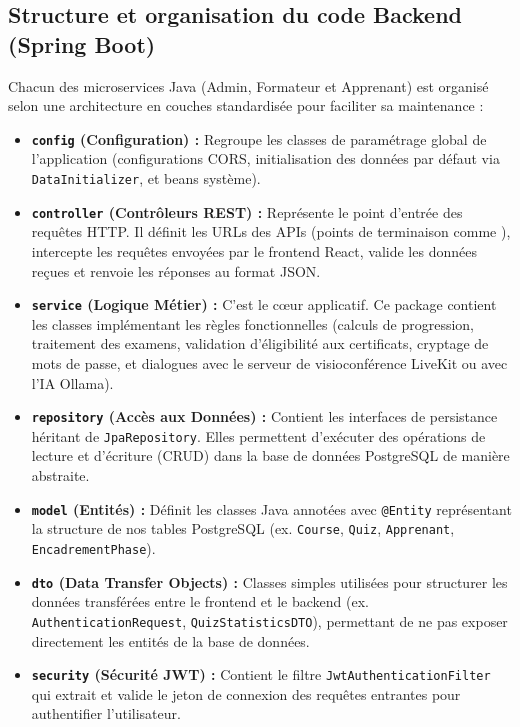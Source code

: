 \subsection{Structure et organisation du code Backend (Spring Boot)}
Chacun des microservices Java (Admin, Formateur et Apprenant) est organisé selon une architecture en couches standardisée pour faciliter sa maintenance :
\begin{itemize}
    \item \textbf{\texttt{config} (Configuration) :} Regroupe les classes de paramétrage global de l'application (configurations CORS, initialisation des données par défaut via \texttt{DataInitializer}, et beans système).
    \item \textbf{\texttt{controller} (Contrôleurs REST) :} Représente le point d'entrée des requêtes HTTP. Il définit les URLs des APIs (points de terminaison comme ), intercepte les requêtes envoyées par le frontend React, valide les données reçues et renvoie les réponses au format JSON.
    \item \textbf{\texttt{service} (Logique Métier) :} C'est le cœur applicatif. Ce package contient les classes implémentant les règles fonctionnelles (calculs de progression, traitement des examens, validation d'éligibilité aux certificats, cryptage de mots de passe, et dialogues avec le serveur de visioconférence LiveKit ou avec l'IA Ollama).
    \item \textbf{\texttt{repository} (Accès aux Données) :} Contient les interfaces de persistance héritant de \texttt{JpaRepository}. Elles permettent d'exécuter des opérations de lecture et d'écriture (CRUD) dans la base de données PostgreSQL de manière abstraite.
    \item \textbf{\texttt{model} (Entités) :} Définit les classes Java annotées avec \texttt{@Entity} représentant la structure de nos tables PostgreSQL (ex. \texttt{Course}, \texttt{Quiz}, \texttt{Apprenant}, \texttt{EncadrementPhase}).
    \item \textbf{\texttt{dto} (Data Transfer Objects) :} Classes simples utilisées pour structurer les données transférées entre le frontend et le backend (ex. \texttt{AuthenticationRequest}, \texttt{QuizStatisticsDTO}), permettant de ne pas exposer directement les entités de la base de données.
    \item \textbf{\texttt{security} (Sécurité JWT) :} Contient le filtre \texttt{JwtAuthenticationFilter} qui extrait et valide le jeton de connexion des requêtes entrantes pour authentifier l'utilisateur.
\end{itemize}

